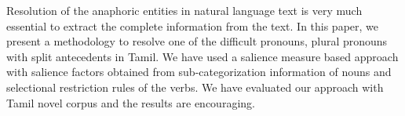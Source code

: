 Resolution of the anaphoric entities in natural language text is very much essential to extract the complete information from the text. In this paper, we present a methodology to resolve one of the difficult pronouns, plural pronouns with split antecedents in Tamil. We have used a salience measure based approach with salience factors obtained from sub-categorization information of nouns and selectional restriction rules of the verbs. We have evaluated our approach with Tamil novel corpus and the results are encouraging.
